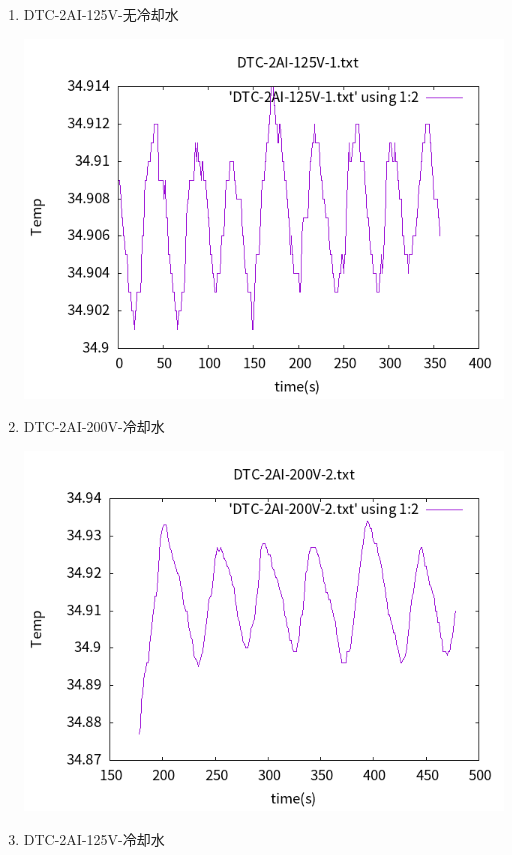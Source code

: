 \documentclass[11pt]{report}
\begin{document}
\begin{enumerate}
\begin{enumerate}
\begin{center}
\end{center}
\item DTC-2AI-125V-无冷却水
\label{sec:org314e972}
\begin{center}
\includegraphics[width=.9\linewidth]{../img/DTC-2AI-125V-1.txt.png}
\end{center}
\item DTC-2AI-200V-冷却水
\label{sec:org24c962a}
\begin{center}
\includegraphics[width=.9\linewidth]{../img/DTC-2AI-200V-2.txt.png}
\end{center}
\item DTC-2AI-125V-冷却水
\label{sec:org33b5963}
\begin{center}

\end{center}
\end{enumerate}
\end{enumerate}
\end{document}
